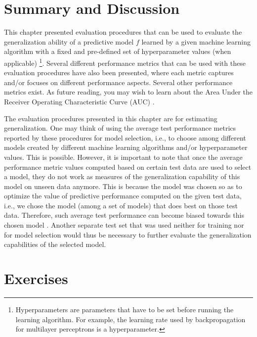 \section{Summary and Discussion}

This chapter presented evaluation procedures that can be used to evaluate the generalization ability of a predictive model $f$ learned by a given machine learning algorithm with a fixed and pre-defined set of hyperparameter values (when applicable) \footnote{Hyperparameters are parameters that have to be set before running the learning algorithm. For example, the learning rate used by backpropagation for multilayer perceptrons is a hyperparameter.}. Several different performance metrics that can be used with these evaluation procedures have also been presented, where each metric captures and/or focuses on different performance aspects. Several other performance metrics exist. As future reading, you may wish to learn about the Area Under the Receiver Operating Characteristic Curve (AUC) \cite{AUC}.

The evaluation procedures presented in this chapter are for estimating generalization. One may think of using the average test performance metrics reported by these procedures for model selection, i.e., to choose among different models created by different machine learning algorithms and/or hyperparameter values. This is possible. However, it is important to note that once the average performance metric values computed based on certain test data are used to select a model, they do not work as measures of the generalization capability of this model on unseen data anymore. This is because the model was chosen so as to optimize the value of predictive performance computed on the given test data, i.e., we chose the model (among a set of models) that does best on those test data. Therefore, such average test performance can become biased towards this chosen model  \cite{CawleyTalbot2010}. Another separate test set that was used neither for training nor for model selection would thus be necessary to further evaluate the generalization capabilities of the selected model.

\section{Exercises}


